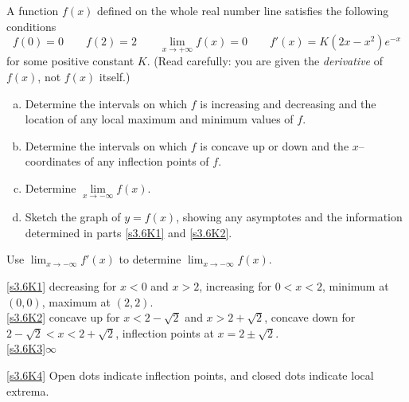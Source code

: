 \begin{question}[1999H,2012H]
A function $f(x)$ defined on the whole real number line satisfies
the following conditions
$$
f(0)=0\qquad
f(2)=2\qquad
\lim_{x\rightarrow+\infty}f(x)=0\qquad
f'(x)=K(2x-x^2)e^{-x}
$$
for some positive constant $K$. (Read carefully: you are given the \emph{derivative} of $f(x)$, not $f(x)$ itself.)

\begin{enumerate}[(a)]
\item\label{s3.6K1} Determine the intervals on which $f$ is increasing and decreasing
and the location of any local maximum and minimum values of $f$.
\item\label{s3.6K2} Determine the intervals on which $f$ is concave up or down
and the $x$--coordinates of any inflection points of $f$.
\item\label{s3.6K3} Determine  $\lim\limits_{x\rightarrow-\infty}f(x)$.
\item\label{s3.6K4} Sketch the graph of $y=f(x)$, showing any asymptotes and the
information determined in parts \eqref{s3.6K1} and \eqref{s3.6K2}.
\end{enumerate}
\end{question}
\begin{hint}
Use $\displaystyle\lim_{x \rightarrow - \infty}f'(x)$ to determine $\displaystyle\lim_{x \rightarrow - \infty}f(x)$.
\end{hint}
\begin{answer}
\eqref{s3.6K1} decreasing for $x<0$ and $x>2$, increasing for $0 < x < 2$, minimum at $(0,0)$, maximum at $(2,2)$.\\
\eqref{s3.6K2} concave up for $x<2-\sqrt{2}$ and $x>2+\sqrt{2}$, concave down for $2-\sqrt 2 < x < 2+\sqrt 2$, inflection points at $x = 2\pm \sqrt{2}$.
\\ \eqref{s3.6K3}$\infty$

\eqref{s3.6K4}
Open dots indicate inflection points, and closed dots indicate local extrema.
\begin{center}\end{center}
\end{answer}
